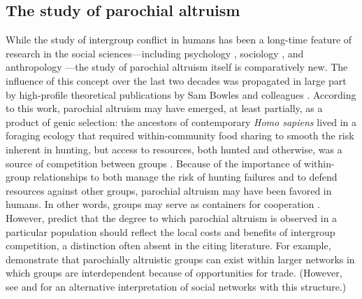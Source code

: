 \documentclass[bibauthoryear]{aa}
\begin{document}
\subsection{The study of parochial altruism}\label{onepointone}

While the study of intergroup conflict in humans has been a long-time feature of research in the social sciences---including psychology \citep[e.g.,][]{tajfel1982social, yamagishi2016parochial}, sociology \citep[e.g.,][]{gluckman1960tribalism}, and anthropology \citep{Vayda1961}---the study of parochial altruism itself is comparatively new. The influence of this concept over the last two decades was propagated in large part by high-profile theoretical publications by Sam Bowles and colleagues \citep{choi2007coevolution, bowles2003origins, bowles2004persistent}. According to this work, parochial altruism may have emerged, at least partially, as a product of genic selection: the ancestors of contemporary \textit{Homo sapiens} lived in a foraging ecology that required within-community food sharing to smooth the risk inherent in hunting, but access to resources, both hunted and otherwise, was a source of competition between groups \citep{choi2007coevolution}. Because of the importance of within-group relationships to both manage the risk of hunting failures and to defend resources against other groups, parochial altruism may have been favored in humans. In other words, groups may serve as containers for cooperation \citep{boydricherson1985}. However, \citet{bowles2003origins} predict that the degree to which parochial altruism is observed in a particular population should reflect the local costs and benefits of intergroup competition, a distinction often absent in the citing literature. For example, \citet{bowles2004persistent} demonstrate that parochially altruistic groups can exist within larger networks in which groups are interdependent because of opportunities for trade. (However, see \citet{yamagishi2011trust} and \citet{yamagishi2016parochial} for an alternative interpretation of social networks with this structure.)
\end{document}
